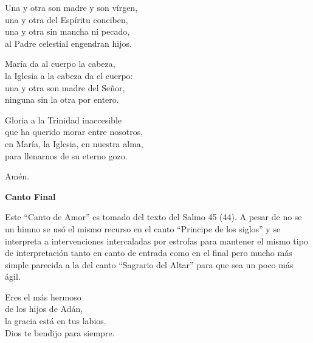 \documentclass[12pt, letterpaper]{report}
\begin{document}
    \noindent
    Una y otra son madre y son v\'irgen,\\
    una y otra del Esp\'iritu conciben,\\
    una y otra sin mancha ni pecado,\\
    al Padre celestial engendran hijos.

    \noindent
    Mar\'ia da al cuerpo la cabeza,\\
    la Iglesia a la cabeza da el cuerpo:\\
    una y otra son madre del Se\~nor,\\
    ninguna sin la otra por entero.

    \noindent
    Gloria a la Trinidad inaccesible\\
    que ha querido morar entre nosotros,\\
    en Mar\'ia, la Iglesia, en nuestra alma,\\
    para llenarnos de su eterno gozo.

    \noindent
    Am\'en.
    \clearpage




    \begin{center}
      \LARGE \textbf{Canto Final}
    \end{center}

    \Large Este ``Canto de Amor'' es tomado del texto del Salmo 45 (44). A pesar de no se un himno se us\'o el mismo recurso en el canto ``Principe de los siglos'' y se interpreta a intervenciones intercaladas por estrofas para mantener el mismo tipo de interpretaci\'on tanto en canto de entrada como en el final pero mucho m\'as simple parecida a la del canto ``Sagrario del Altar'' para que sea un poco m\'as \'agil.

    \noindent
    \LARGE Eres el m\'as hermoso\\
    de los hijos de Ad\'an,\\
    la gracia est\'a en tus labios.\\
    Dios te bendijo para siempre.
\end{document}
